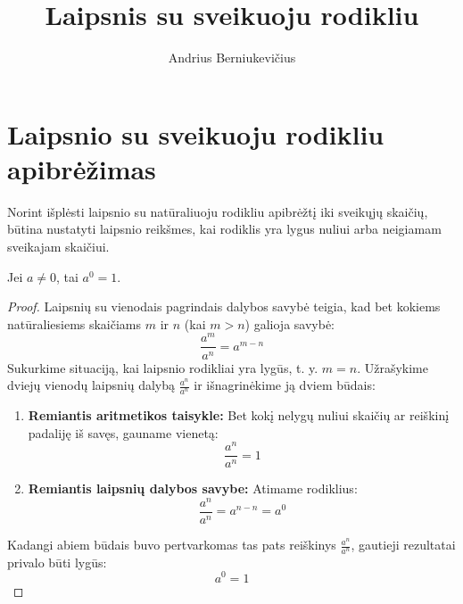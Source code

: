\documentclass[11pt,a4paper]{scrartcl}
\title{Laipsnis su sveikuoju rodikliu}
\author{Andrius Berniukevičius}
\begin{document}
\maketitle


\section{Laipsnio su sveikuoju rodikliu apibrėžimas}
Norint išplėsti laipsnio su natūraliuoju rodikliu apibrėžtį iki sveikųjų skaičių, būtina nustatyti laipsnio reikšmes, kai rodiklis yra lygus nuliui arba neigiamam sveikajam skaičiui. 
\begin{proposition}
Jei $a \neq 0$, tai $a^0 = 1$.
\end{proposition}
\begin{proof}
Laipsnių su vienodais pagrindais dalybos savybė teigia, kad bet kokiems natūraliesiems skaičiams $m$ ir $n$ (kai $m > n$) galioja savybė:
$$\frac{a^m}{a^n} = a^{m-n}$$
Sukurkime situaciją, kai laipsnio rodikliai yra lygūs, t. y. $m = n$. Užrašykime dviejų vienodų laipsnių dalybą $\frac{a^n}{a^n}$ ir išnagrinėkime ją dviem būdais:
\begin{enumerate}
    \item \textbf{Remiantis aritmetikos taisykle:} Bet kokį nelygų nuliui skaičių ar reiškinį padaliję iš savęs, gauname vienetą:
    $$\frac{a^n}{a^n} = 1$$
    \item \textbf{Remiantis laipsnių dalybos savybe:} Atimame rodiklius:
    $$\frac{a^n}{a^n} = a^{n-n} = a^0$$
\end{enumerate}
Kadangi abiem būdais buvo pertvarkomas tas pats reiškinys $\frac{a^n}{a^n}$, gautieji rezultatai privalo būti lygūs:
$$a^0 = 1$$
\end{proof}
\end{document}

